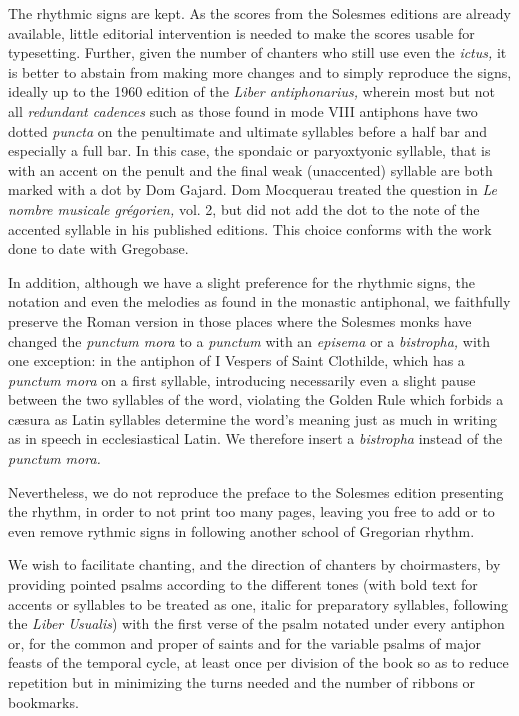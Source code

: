 \begin{enpars}

The rhythmic signs are kept. As the scores from the Solesmes editions are already available, little editorial intervention is needed to make the scores usable for typesetting. Further, given the number of chanters who still use even the \textit{ictus,}  it is better to abstain from making more changes and to simply reproduce the signs, ideally up to the 1960 edition of the \textit{Liber antiphonarius,} wherein most but not all \textit{redundant cadences} such as those found in mode VIII antiphons have two dotted \textit{puncta} on the penultimate and ultimate syllables before a half bar and especially a full bar. In this case, the spondaic or paryoxtyonic syllable, that is with an accent on the penult and the final weak (unaccented) syllable are both marked with a dot by Dom Gajard. Dom Mocquerau treated the question in \textit{Le nombre musicale grégorien,} vol. 2, but did not add the dot to the note of the accented syllable in his published editions. This choice conforms with the work done to date with Gregobase.

In addition, although we have a slight preference for the rhythmic signs, the notation and even the melodies as found in the monastic antiphonal, we faithfully preserve the Roman version in those places where the Solesmes monks have changed the \textit{punctum mora} to a  \textit{punctum} with an \textit{episema} or a \textit{bistropha,} with one exception: in the antiphon of I Vespers of Saint Clothilde, which has a \textit{punctum mora} on a first syllable, introducing necessarily even a slight pause between the two syllables of the word, violating the Golden Rule which forbids a cæsura as Latin syllables determine the word's meaning just as much in writing as in speech in ecclesiastical Latin. We therefore insert a \textit{bistropha} instead of the \textit{punctum mora.}

Nevertheless, we do not reproduce the preface to the Solesmes edition presenting the rhythm, in order to not print too many pages, leaving you free to add or to even remove rythmic signs in following another school of Gregorian rhythm.

We wish to facilitate chanting, and the direction of chanters by choirmasters, by providing pointed psalms according to the different tones (with bold text for accents or syllables to be treated as one, italic for preparatory syllables, following the \textit{Liber Usualis}) with the first verse of the psalm notated under every antiphon or, for the common and proper of saints and for the variable psalms of major feasts of the temporal cycle, at least once per division of the book so as to reduce repetition but in minimizing the turns needed and the number of ribbons or bookmarks.


\end{enpars}
